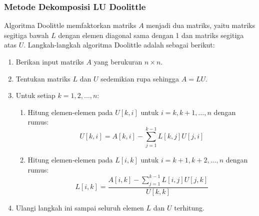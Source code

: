 \documentclass[a4paper,extrafontsizes, 9pt]{memoir}
\begin{document}
\begin{multicols}{3}
          \subsubsection*{\small Metode Dekomposisi LU Doolittle}
          Algoritma Doolittle memfaktorkan matriks \(A\) menjadi dua matriks, yaitu matriks segitiga bawah \(L\) dengan elemen diagonal sama dengan 1 dan matriks segitiga atas \(U\). Langkah-langkah algoritma Doolittle adalah sebagai berikut:
          \begin{enumerate}
            \item Berikan input matriks \(A\) yang berukuran \(n \times n\).
            \item Tentukan matriks \(L\) dan \(U\) sedemikian rupa sehingga \(A = LU\).
            \item Untuk setiap \(k = 1, 2, \dots, n\):
            \begin{enumerate}
                \item Hitung elemen-elemen pada \(U[k,i]\) untuk \(i = k, k+1, \dots, n\) dengan rumus:
                \[
                U[k,i] = A[k,i] - \sum_{j=1}^{k-1} L[k,j]U[j,i]
                \]
                \item Hitung elemen-elemen pada \(L[i,k]\) untuk \(i = k+1, k+2, \dots, n\) dengan rumus:
                \[
                L[i,k] = \frac{A[i,k] - \sum_{j=1}^{k-1} L[i,j]U[j,k]}{U[k,k]}
                \]
            \end{enumerate}
            \item Ulangi langkah ini sampai seluruh elemen \(L\) dan \(U\) terhitung.
        \end{enumerate}
                

\end{multicols}
\end{document}
